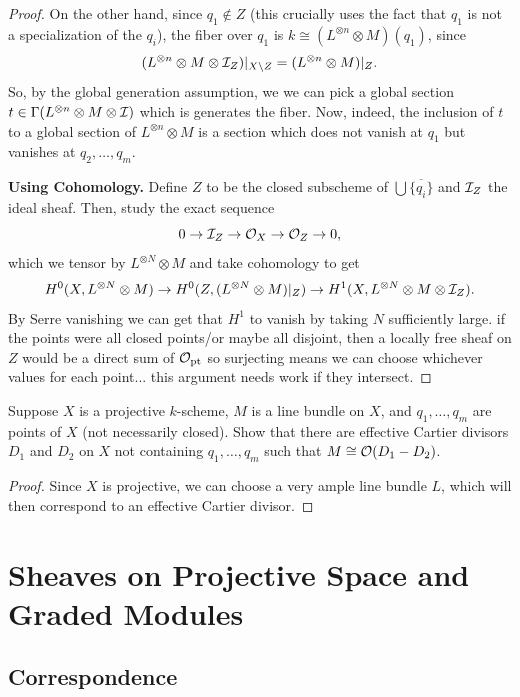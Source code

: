 \documentclass[12pt]{article}
\begin{document}
\begin{proof}
    On the other hand, since $q_1 \not\in Z$ (this crucially uses the fact that $q_1$ is not a specialization of the $q_i$), the fiber over $q_1$ is $k\cong (L^{\otimes n}\otimes M)(q_1)$, since
    \[(L^{\otimes n} \otimes M \otimes \mathcal{I}_Z)|_{X\setminus Z} = (L^{\otimes n} \otimes M)|_Z.\]
    So, by the global generation assumption, we we can pick a global section $t\in \Gamma(L^{\otimes n} \otimes M \otimes \mathcal{I})$ which is generates the fiber. Now, indeed, the inclusion of $t$ to a global section of $L^{\otimes n}\otimes M$ is a section which does not vanish at $q_1$ but vanishes at $q_2,\dots,q_m$.
    
    \textbf{Using Cohomology.}  Define $Z$ to be the closed subscheme of $\bigcup \overline{\{q_i\}}$ and $\mathcal{I}_Z$ the ideal sheaf. Then, study the exact sequence
    \[0\to \mathcal{I}_Z \to \mathcal{O}_X \to \mathcal{O}_Z \to 0,\]
    which we tensor by $L^{\otimes N}\otimes M$ and take cohomology to get
    \[H^0(X,L^{\otimes N}\otimes M) \to H^0(Z,(L^{\otimes N}\otimes M)|_Z) \to H^1(X,L^{\otimes N}\otimes M \otimes \mathcal{I}_Z).\]
    By Serre vanishing we can get that $H^1$ to vanish by taking $N$ sufficiently large. {\color{red} if the points were all closed points/or maybe all disjoint, then a locally free sheaf on $Z$ would be a direct sum of $\mathcal{O}_{\mathrm{pt}}$ so surjecting means we can choose whichever values for each point... this argument needs work if they intersect.}
\end{proof}

\begin{prop}
    Suppose $X$ is a projective $k$-scheme, $M$ is a line bundle on $X$, and $q_1,\dots,q_m$ are points of $X$ (not necessarily closed). Show that there are effective Cartier divisors $D_1$ and $D_2$ on $X$ not containing $q_1,\dots,q_m$ such that $M\cong \mathcal{O}(D_1-D_2)$.
\end{prop}

\begin{proof}
    Since $X$ is projective, we can choose a very ample line bundle $L$, which will then correspond to an effective Cartier divisor.
\end{proof}

\section{Sheaves on Projective Space and Graded Modules}

\subsection{Correspondence}
\end{document}
